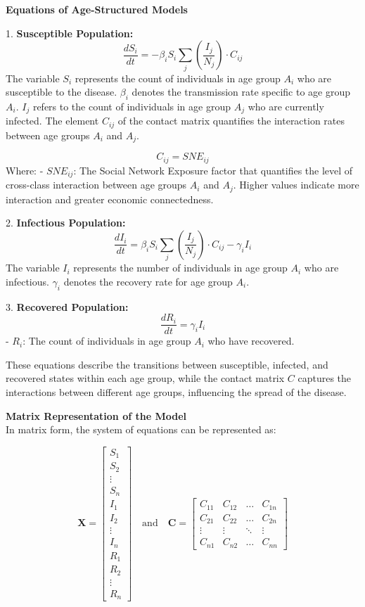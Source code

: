 \documentclass[9 pt]{article} %
\begin{document}
\textbf{Equations of Age-Structured Models}

1. \textbf{Susceptible Population:}
   \[
   \frac{dS_i}{dt} = -\beta_i S_i \sum_{j} \left( \frac{I_j}{N_j} \right) \cdot C_{ij}
   \]
The variable \( S_i \) represents the count of individuals in age group \( A_i \) who are susceptible to the disease. \( \beta_i \) denotes the transmission rate specific to age group \( A_i \). \( I_j \) refers to the count of individuals in age group \( A_j \) who are currently infected. The element \( C_{ij} \) of the contact matrix quantifies the interaction rates between age groups \( A_i \) and \( A_j \).

   \[
   C_{ij} = SNE_{ij}
   \]
   Where:
   - \( SNE_{ij} \): The Social Network Exposure factor that quantifies the level of cross-class interaction between age groups \( A_i \) and \( A_j \). Higher values indicate more interaction and greater economic connectedness.

2. \textbf{Infectious Population:}
   \[
   \frac{dI_i}{dt} = \beta_i S_i \sum_{j} \left( \frac{I_j}{N_j} \right) \cdot C_{ij} - \gamma_i I_i
   \]
The variable \( I_i \) represents the number of individuals in age group \( A_i \) who are infectious. \( \gamma_i \) denotes the recovery rate for age group \( A_i \).

3. \textbf{Recovered Population:}
   \[
   \frac{dR_i}{dt} = \gamma_i I_i
   \]
   - \( R_i \): The count of individuals in age group \( A_i \) who have recovered.

These equations describe the transitions between susceptible, infected, and recovered states within each age group, while the contact matrix \( C \) captures the interactions between different age groups, influencing the spread of the disease.

\textbf{Matrix Representation of the Model} \\
In matrix form, the system of equations can be represented as:

\[
\mathbf{X} = \begin{bmatrix} S_1 \\ S_2 \\ \vdots \\ S_n \\ I_1 \\ I_2 \\ \vdots \\ I_n \\ R_1 \\ R_2 \\ \vdots \\ R_n \end{bmatrix}
\quad \text{and} \quad \mathbf{C} = \begin{bmatrix} C_{11} & C_{12} & \ldots & C_{1n} \\ C_{21} & C_{22} & \ldots & C_{2n} \\ \vdots & \vdots & \ddots & \vdots \\ C_{n1} & C_{n2} & \ldots & C_{nn} \end{bmatrix}
\]
\end{document}
